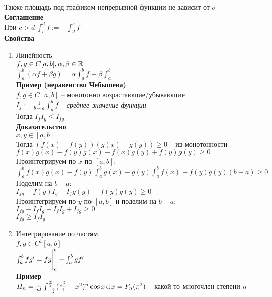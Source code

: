 \documentclass[12pt]{article}
\begin{document}
Также площадь под графиком непрерывной функции не зависит от $\sigma$\\
\textbf{Соглашение}\\
При $c > d\ \int_c^d f := - \int_d^c f$\\
\textbf{Свойства}
\begin{enumerate}
    \item Линейность\\
    $f, g \in C[a,b], \alpha, \beta \in \mathbb{R}$\\
    $\int_a^b (\alpha f + \beta g) = \alpha \int_a^b f + \beta \int_a^b$\\
    \textbf{Пример (неравенство Чебышева)}\\
    $f, g \in C[a,b]$ -- монотонно возрастающие/убывающие\\
    $I_f := \frac1{b-a}\int_a^b f$ -- \textit{среднее значение функции}\\
    Тогда $I_f I_g \leq I_{fg}$\\
    \textbf{Доказательство}\\
    $x,y \in [a,b]$\\
    Тогда $(f(x)-f(y))(g(x)-g(y)) \geq 0$ -- из монотонности\\
    $f(x)g(x) - f(y)g(x)-f(x)g(y)+f(y)g(y) \geq 0$\\
    Проинтегрируем по $x$ по $[a,b]$:\\
    $\int_a^b f(x)g(x) - f(y)\int_a^b g(x) - g(y)\int_a^b f(x) - f(y)g(y)(b-a) \geq 0$\\
    Поделим на $b-a$:\\
    $I_{fg} - f(y)I_g - I_f g(y) + f(y)g(y) \geq 0$\\
    Проинтегрируем по $y$ по $[a,b]$ и поделим на $b-a$:\\
    $I_{fg} - I_fI_g-I_fI_g + I_{fg} \geq 0$\\
    $I_{fg} \geq I_fI_g$
    \item Интегрирование по частям\\
    $f, g \in C^1[a,b]$\\
    $\int_a^b fg' = fg\Biggr|_a^b - \int_a^b gf'$\\
    \textbf{Пример}\\
    $H_n = \frac{1}{n!}\int_{-\frac\pi2}^{\frac\pi2}(\frac{\pi^2}4 - x^2)^n\cos x \operatorname{d} x = F_n(\pi^2)$ -- какой-то многочлен степени $n$\\

\end{enumerate}
\end{document}
